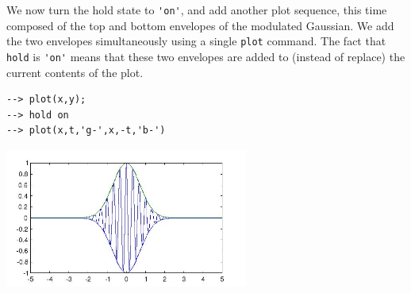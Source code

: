 We now turn the hold state to \verb|'on'|, and add another plot
sequence, this time composed of the top and bottom envelopes of
the modulated Gaussian.  We add the two envelopes simultaneously
using a single \verb|plot| command.  The fact that \verb|hold| is
\verb|'on'| means that these two envelopes are added to (instead of
replace) the current contents of the plot.
\begin{verbatim}
--> plot(x,y);
--> hold on
--> plot(x,t,'g-',x,-t,'b-')
\end{verbatim}


\centerline{\includegraphics[width=8cm]{hold2}}

